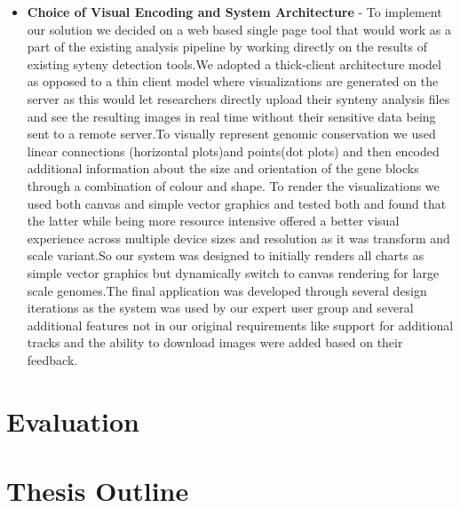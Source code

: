 \begin{itemize}
    \item \textbf{Choice of Visual Encoding and System Architecture} - 
    To implement our solution we decided on a web based single page tool that would work as a part of the existing analysis pipeline by working directly on the results of existing syteny detection tools.We adopted a thick-client architecture model as opposed to a thin client model where visualizations are generated on the server as this would let researchers directly upload their synteny analysis files and see the resulting images in real time without their sensitive data being sent to a remote server.To visually represent genomic conservation we used linear connections (horizontal plots)and points(dot plots) and then encoded additional information about the size and orientation of the gene blocks through a combination of colour and shape.
    To render the visualizations we used both canvas and simple vector graphics and tested both and found that the latter while being more resource intensive offered a better visual experience across multiple device sizes and resolution as it was transform and scale variant.So our system was designed to initially renders all charts as simple vector graphics but dynamically switch to canvas rendering for large scale genomes.The final application was developed through several design iterations as the system was used by our expert user group and several additional features not in our original requirements like support for additional tracks and the ability to download images were added based on their feedback. 

\end{itemize}

\section{Evaluation}
\section{Thesis Outline}